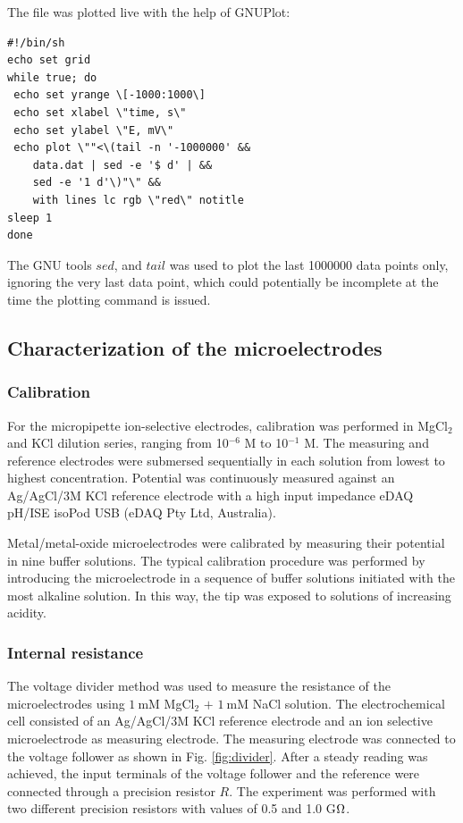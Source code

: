 The file was plotted live with the help of GNUPlot:

\begin{lstlisting}
#!/bin/sh
echo set grid
while true; do
 echo set yrange \[-1000:1000\]
 echo set xlabel \"time, s\"
 echo set ylabel \"E, mV\"
 echo plot \""<\(tail -n '-1000000' &&
	data.dat | sed -e '$ d' | &&
	sed -e '1 d'\)"\" &&
	with lines lc rgb \"red\" notitle
sleep 1
done
\end{lstlisting}

The GNU tools $sed$, and $tail$ was used to plot the last 1000000 data points only, ignoring the very last data point, which could potentially be incomplete at the time the plotting command is issued.

 		\subsection{Characterization of the microelectrodes}
			\subsubsection{Calibration}
For the micropipette ion-selective electrodes, calibration was performed in MgCl$_2$ and KCl dilution series, ranging from 10$^{-6}$ M to 10$^{-1}$ M.
The measuring and reference electrodes were submersed sequentially in each solution from lowest to highest concentration.
Potential was continuously measured against an Ag/AgCl/3M KCl reference electrode with a high input impedance eDAQ pH/ISE isoPod USB (eDAQ Pty Ltd, Australia).

Metal/metal-oxide microelectrodes were calibrated by measuring their potential in nine buffer solutions.
The typical calibration procedure was performed by introducing the microelectrode in a sequence of buffer solutions initiated with the most alkaline solution.
In this way, the tip was exposed to solutions of increasing acidity.
 
			\subsubsection{Internal resistance}
The voltage divider method was used to measure the resistance of the microelectrodes using $1~$mM MgCl$_2$ $+$ $1~$mM NaCl solution.
The electrochemical cell consisted of an Ag/AgCl/3M KCl reference electrode and an ion selective microelectrode as measuring electrode.
The measuring electrode was connected to the voltage follower as shown in Fig. \ref{fig:divider}.
After a steady reading was achieved, the input terminals of the voltage follower and the reference were connected through a precision resistor $R$.
The experiment was performed with two different precision resistors with values of 0.5 and 1.0 G$\ohm$.

